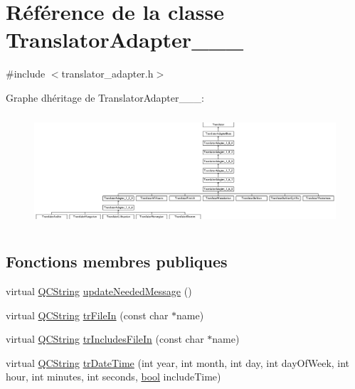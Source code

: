 \hypertarget{class_translator_adapter__1__6__3}{}\section{Référence de la classe Translator\+Adapter\+\_\+\_\+\_}
\label{class_translator_adapter__1__6__3}


{\ttfamily \#include $<$translator\+\_\+adapter.\+h$>$}

Graphe d\textquotesingle{}héritage de Translator\+Adapter\+\_\+\_\+\_\+:\begin{figure}[H]
\begin{center}
\leavevmode
\includegraphics[height=4.173441cm]{class_translator_adapter__1__6__3}
\end{center}
\end{figure}
\subsection*{Fonctions membres publiques}
\begin{DoxyCompactItemize}
\item 
virtual \hyperlink{class_q_c_string}{Q\+C\+String} \hyperlink{class_translator_adapter__1__6__3_ab3d79abfb926c41bd7609eeb706654fe}{update\+Needed\+Message} ()
\item 
virtual \hyperlink{class_q_c_string}{Q\+C\+String} \hyperlink{class_translator_adapter__1__6__3_a3645d77e245f76891d9926254208e840}{tr\+File\+In} (const char $\ast$name)
\item 
virtual \hyperlink{class_q_c_string}{Q\+C\+String} \hyperlink{class_translator_adapter__1__6__3_a3f0eecc876597e903d6dd557a72e598f}{tr\+Includes\+File\+In} (const char $\ast$name)
\item 
virtual \hyperlink{class_q_c_string}{Q\+C\+String} \hyperlink{class_translator_adapter__1__6__3_a9a4db38fc5d4ddb87a9ac244fd6cef27}{tr\+Date\+Time} (int year, int month, int day, int day\+Of\+Week, int hour, int minutes, int seconds, \hyperlink{qglobal_8h_a1062901a7428fdd9c7f180f5e01ea056}{bool} include\+Time)
\end{DoxyCompactItemize}
